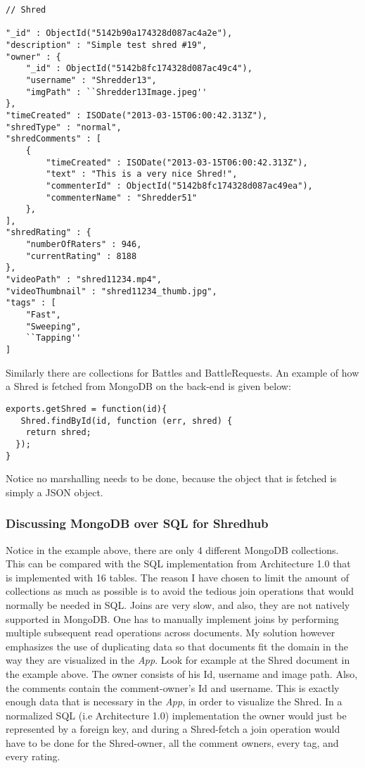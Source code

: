 \begin{lstlisting}
// Shred

"_id" : ObjectId("5142b90a174328d087ac4a2e"),
"description" : "Simple test shred #19",
"owner" : {
	"_id" : ObjectId("5142b8fc174328d087ac49c4"),
	"username" : "Shredder13",
	"imgPath" : ``Shredder13Image.jpeg''
},
"timeCreated" : ISODate("2013-03-15T06:00:42.313Z"),
"shredType" : "normal",
"shredComments" : [
	{
		"timeCreated" : ISODate("2013-03-15T06:00:42.313Z"),
		"text" : "This is a very nice Shred!",
		"commenterId" : ObjectId("5142b8fc174328d087ac49ea"),
		"commenterName" : "Shredder51"
	},
],
"shredRating" : {
	"numberOfRaters" : 946,
	"currentRating" : 8188
},
"videoPath" : "shred11234.mp4",
"videoThumbnail" : "shred11234_thumb.jpg",
"tags" : [
	"Fast",
	"Sweeping",
	``Tapping''	
]
\end{lstlisting}
Similarly there are collections for Battles and BattleRequests. An example of how a Shred is fetched from MongoDB on the back-end is given below:

\begin{lstlisting}
exports.getShred = function(id){
   Shred.findById(id, function (err, shred) {
    return shred;
  });
}
\end{lstlisting}
Notice no marshalling needs to be done, because the object that is fetched is simply a JSON object. 

\subsubsection{Discussing MongoDB over SQL for Shredhub}
Notice in the example above, there are only 4 different MongoDB collections. This can be compared with the SQL implementation from Architecture 1.0 that is implemented with 16 tables. The reason I have chosen to limit the amount of collections as much as possible is to avoid the tedious join operations that would normally be needed in SQL. Joins are very slow, and also, they are not natively supported in MongoDB. One has to manually implement joins by performing multiple subsequent read operations across documents. My solution however emphasizes the use of duplicating data so that documents fit the domain in the way they are visualized in the \textit{App}. Look for example at the Shred document in the example above. The owner consists of his Id, username and image path. Also, the comments contain the comment-owner's Id and username. This is exactly enough data that is necessary in the \textit{App}, in order to visualize the Shred. In a normalized SQL (i.e Architecture 1.0) implementation the owner would just be represented by a foreign key, and during a Shred-fetch a join operation would have to be done for the Shred-owner, all the comment owners, every tag, and every rating. 

